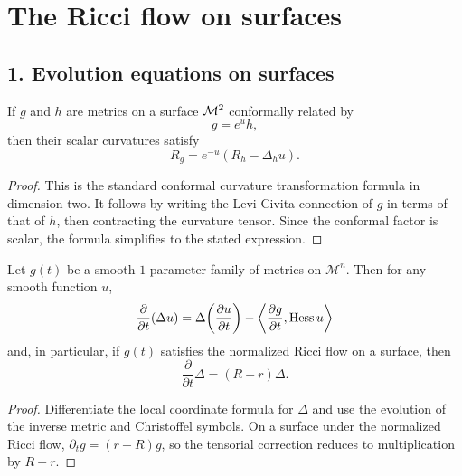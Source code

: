 \chapter{The Ricci flow on surfaces}

\section*{1. Evolution equations on surfaces}

\begin{theorem}
\label{ch05-thm-conformal-scalar-curvature}
If \(g\) and \(h\) are metrics on a surface \(\mathcal{M}^2\) conformally related by
\[
g=e^{u}h,
\]
then their scalar curvatures satisfy
\[
R_g=e^{-u}\left(R_h-\Delta_h u\right).
\]
\end{theorem}

\begin{proof}
This is the standard conformal curvature transformation formula in dimension two.
It follows by writing the Levi-Civita connection of \(g\) in terms of that of \(h\), then contracting the curvature tensor. Since the conformal factor is scalar, the formula simplifies to the stated expression.
\end{proof}

\begin{lemma}
\label{ch05-lem-laplacian-evolution}
Let \(g(t)\) be a smooth \(1\)-parameter family of metrics on \(\mathcal M^n\). Then for any smooth function \(u\),
\[
\frac{\partial}{\partial t}(\Delta u)
=\Delta\!\left(\frac{\partial u}{\partial t}\right)
-\left\langle \frac{\partial g}{\partial t},\operatorname{Hess} u\right\rangle
\]
and, in particular, if \(g(t)\) satisfies the normalized Ricci flow on a surface, then
\[
\frac{\partial}{\partial t}\Delta=(R-r)\Delta.
\]
\end{lemma}

\begin{proof}
Differentiate the local coordinate formula for \(\Delta\) and use the evolution of the inverse metric and Christoffel symbols. On a surface under the normalized Ricci flow, \(\partial_t g=(r-R)g\), so the tensorial correction reduces to multiplication by \(R-r\).
\end{proof}

